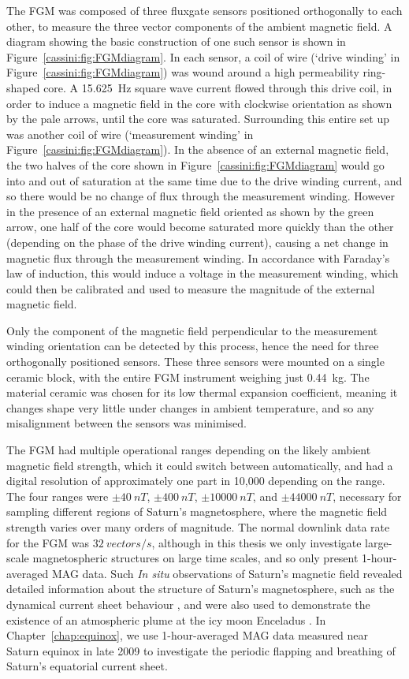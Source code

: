 The FGM was composed of three fluxgate sensors positioned orthogonally to each other, to measure the three vector components of the ambient magnetic field. A diagram showing the basic construction of one such sensor is shown in Figure~\ref{cassini:fig:FGMdiagram}. In each sensor, a coil of wire (`drive winding' in Figure~\ref{cassini:fig:FGMdiagram}) was wound around a high permeability ring-shaped core. A \SI{15.625}{\hertz} square wave current flowed through this drive coil, in order to induce a magnetic field in the core with clockwise orientation as shown by the pale arrows, until the core was saturated. Surrounding this entire set up was another coil of wire (`measurement winding' in Figure~\ref{cassini:fig:FGMdiagram}). In the absence of an external magnetic field, the two halves of the core shown in Figure~\ref{cassini:fig:FGMdiagram} would go into and out of saturation at the same time due to the drive winding current, and so there would  be no change of  flux through the measurement winding. However in the presence of an external magnetic field  oriented as shown by  the green arrow, one half of the core would become saturated more quickly than the other (depending on the phase of the drive winding current), causing a net change in magnetic flux through the measurement winding. In accordance with Faraday's law of  induction, this  would induce a voltage in  the measurement winding,  which could then be calibrated and used to measure the magnitude  of the external magnetic field. 

Only the component of the magnetic field perpendicular to the measurement winding orientation can be detected by this process, hence the need for three orthogonally positioned sensors. These three sensors were mounted on a single ceramic block, with the entire FGM  instrument  weighing just \SI{0.44}{kg}. The material ceramic was chosen for its low thermal expansion coefficient,  meaning  it changes shape very little under  changes in ambient temperature, and so any misalignment between the sensors was minimised.

The FGM had multiple operational ranges depending on the likely ambient magnetic field strength, which it could switch between automatically, and had a digital resolution of approximately one part in 10,000 depending on the range. The four ranges were $\pm\SI{40}{nT}$, $\pm\SI{400}{nT}$, $\pm\SI{10000}{nT}$, and $\pm\SI{44000}{nT}$, necessary for sampling different regions of Saturn's magnetosphere, where the magnetic  field strength  varies over many orders of magnitude. The normal downlink data rate for the FGM was $\SI{32}{vectors/s}$, although in this thesis we only investigate large-scale magnetospheric structures on large time scales, and so only present 1-hour-averaged MAG data. Such \textit{In situ} observations of Saturn's magnetic field revealed detailed information about the structure of Saturn's magnetosphere, such as the dynamical current sheet behaviour \citep[e.g.][]{provan2012}, and were also used to demonstrate the existence of an atmospheric plume at the icy moon Enceladus \citep{dougherty2006}. In Chapter~\ref{chap:equinox}, we use 1-hour-averaged MAG data measured near Saturn equinox in late 2009 to investigate the periodic flapping and breathing of Saturn's equatorial current sheet.


